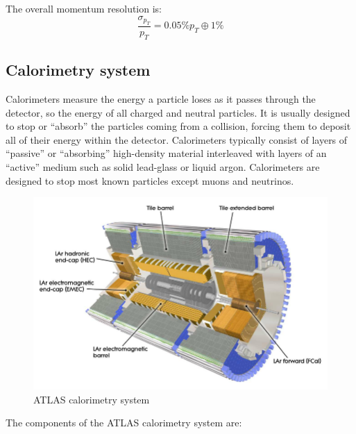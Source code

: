 \documentclass[a4paper, oneside, 11pt, openright]{book}
\begin{document}
					The overall momentum resolution is:
					$$
					\frac{\sigma_{p_T}}{p_T} = 0.05\% p_T \oplus 1\%
					$$
				\subsection{Calorimetry system}
					\cite{Calo intro}Calorimeters measure the energy a particle loses as it passes through the detector, so the energy of all charged and neutral particles. It is usually designed to stop  or “absorb” the particles coming from a collision, forcing them to deposit all of their energy within the detector. Calorimeters typically consist of layers of “passive” or “absorbing” high-density material interleaved with layers of an “active” medium such as solid lead-glass or liquid argon. Calorimeters are designed to stop most known particles except muons and neutrinos.
					\begin{figure} [H]
						\centering
						\includegraphics[width=.6\textwidth]{tesi_images/calorimeters.png} 
						\caption{ATLAS calorimetry system}
						\label{fig:Calorimetry}
					\end{figure}
					The components of the ATLAS calorimetry system are: \cite{ATLAS TDR} \cite{Calorimetry}
\end{document}
